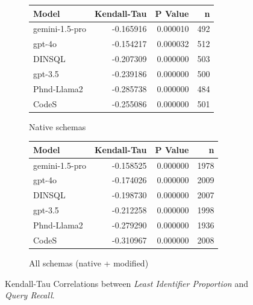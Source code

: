\begin{figure}
  \centering
  \begin{subfigure}{.5\linewidth}
      \centering
      \begin{tabular}{lrrr}
\toprule
Model & Kendall-Tau & P Value & n \\
\midrule
gemini-1.5-pro & -0.165916 & 0.000010 & 492 \\
gpt-4o & -0.154217 & 0.000032 & 512 \\
DINSQL & -0.207309 & 0.000000 & 503 \\
gpt-3.5 & -0.239186 & 0.000000 & 500 \\
Phnd-Llama2 & -0.285738 & 0.000000 & 484 \\
CodeS & -0.255086 & 0.000000 & 501 \\
\bottomrule
\end{tabular}

      \caption{Native schemas}
      \label{table:natlow-recall-ktau-native}
  \end{subfigure}%
  \begin{subfigure}{.5\linewidth}
      \centering
      \begin{tabular}{lrrr}
\toprule
Model & Kendall-Tau & P Value & n \\
\midrule
gemini-1.5-pro & -0.158525 & 0.000000 & 1978 \\
gpt-4o & -0.174026 & 0.000000 & 2009 \\
DINSQL & -0.198730 & 0.000000 & 2007 \\
gpt-3.5 & -0.212258 & 0.000000 & 1998 \\
Phnd-Llama2 & -0.279290 & 0.000000 & 1936 \\
CodeS & -0.310967 & 0.000000 & 2008 \\
\bottomrule
\end{tabular}

      \caption{All schemas (native + modified)}
      \label{table:natlow-recall-ktau-all}
  \end{subfigure}
  \caption{Kendall-Tau Correlations between \emph{Least Identifier Proportion} and \emph{Query Recall}.}
\end{figure}





